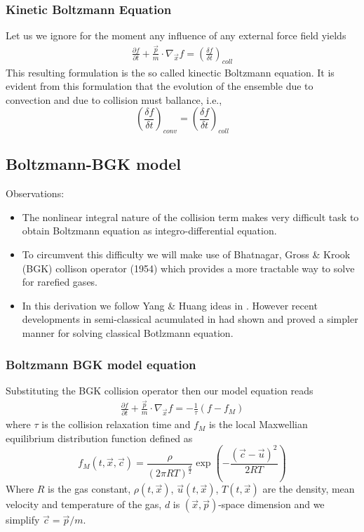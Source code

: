\begin{frame} \frametitle{Kinetic Boltzmann Equation}
	Let us we ignore for the moment any influence of any external force field yields
	\begin{align}
	\frac{\partial{f}}{\partial{t}} + 
	\frac{\vec{p}}{m}\cdot\nabla_{\vec{x}}f =
	\left(\frac{\delta f}{\delta t}\right)_{coll} 
	\label{eq:kinetic_boltzmann}
	\end{align}
	This resulting formulation is the so called kinectic Boltzmann equation. It is evident from this formulation that the evolution of the ensemble due to convection and due to collision must ballance, i.e.,
	\begin{equation*}
	\left(\frac{\delta f}{\delta t}\right)_{conv} =
	\left(\frac{\delta f}{\delta t}\right)_{coll}
	\end{equation*}
\end{frame}

\subsection{Boltzmann-BGK model}
\begin{frame} 
	Observations: 
	\begin{itemize}
	\item The nonlinear integral nature of the collision term makes very difficult task to obtain Boltzmann equation as integro-differential equation.
	\item To circumvent this difficulty we will make use of Bhatnagar, Gross \& Krook (BGK) collison operator (1954) which provides a more tractable way to solve for rarefied gases.
	\item In this derivation we follow Yang \& Huang ideas in \cite{Yang1995323}. However recent developments in semi-classical acumulated in \cite{Shi20089389,Yang2013} had shown and proved a simpler manner for solving classical Botlzmann equation.
	\end{itemize}
\end{frame}

\begin{frame} \frametitle{Boltzmann BGK model equation}
	Substituting the BGK collision operator then our model equation reads
	\begin{align}
	\frac{\partial{f}}{\partial{t}} + 
	\frac{\vec{p}}{m}\cdot\nabla_{\vec{x}}f =
	- \frac{1}{\tau} (f-f_M)
	\label{eq:boltzmann-BGK}
	\end{align}
	where $\tau$ is the collision relaxation time and $f_M$ is the local Maxwellian equilibrium distribution function defined as
	\begin{equation}
	f_M(t,\vec{x},\vec{c})= \frac{\rho}{(2 \pi RT )^{\frac{d}{2}}} \exp\left(-{\frac{(\vec{c}-\vec{u})^2}{2 R T}}
\right)
	\label{eq:classical_feq}
	\end{equation}
	Where $R$ is the gas constant, $\rho(t,\vec{x})$, $\vec{u}(t,\vec{x})$, $T(t,\vec{x})$ are the density, mean velocity and temperature of the gas, $d$ is $(\vec{x},\vec{p})$-space dimension and we simplify $\vec{c}=\vec{p}/m$.
\end{frame}

